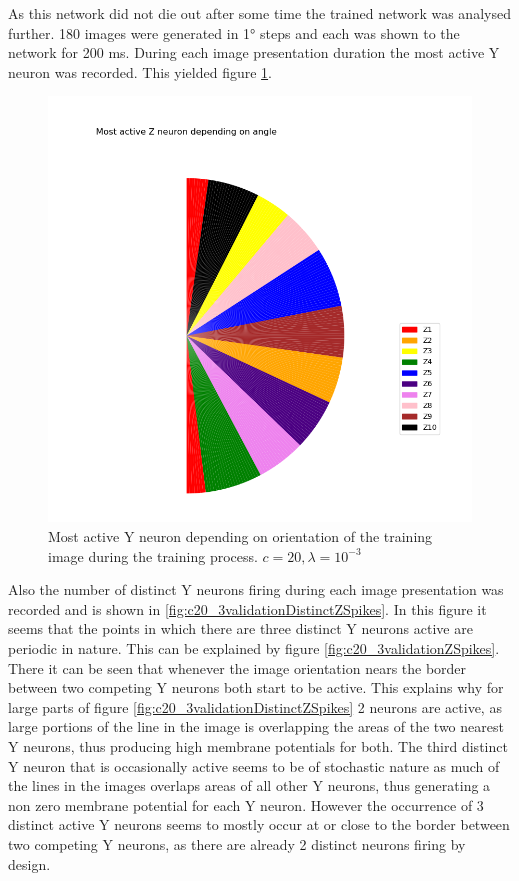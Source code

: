 As this network did not die out after some time the trained network was analysed further. 180 images were generated in 1° steps and each was shown to the network for 200 ms. During each image presentation duration the most active Y neuron was recorded. This yielded figure \ref{fig:c20_3Pie}.

\begin{figure}
  \includegraphics[width=\linewidth]{figures/angleNetwork/c20_3validationPie.png}
  \caption{Most active Y neuron depending on orientation of the training image during the training process. $c = 20, \lambda = 10^{-3}$}
  \label{fig:c20_3Pie}
\end{figure}

Also the number of distinct Y neurons firing during each image presentation was recorded and is shown in \ref{fig:c20_3validationDistinctZSpikes}. In this figure it seems that the points in which there are three distinct Y neurons active are periodic in nature. This can be explained by figure \ref{fig:c20_3validationZSpikes}. There it can be seen that whenever the image orientation nears the border between two competing Y neurons both start to be active. This explains why for large parts of figure \ref{fig:c20_3validationDistinctZSpikes} 2 neurons are active, as large portions of the line in the image is overlapping the areas of the two nearest Y neurons, thus producing high membrane potentials for both. The third distinct Y neuron that is occasionally active seems to be of stochastic nature as much of the lines in the images overlaps areas of all other Y neurons, thus generating a non zero membrane potential for each Y neuron. However the occurrence of 3 distinct active Y neurons seems to mostly occur at or close to the border between two competing Y neurons, as there are already 2 distinct neurons firing by design.

